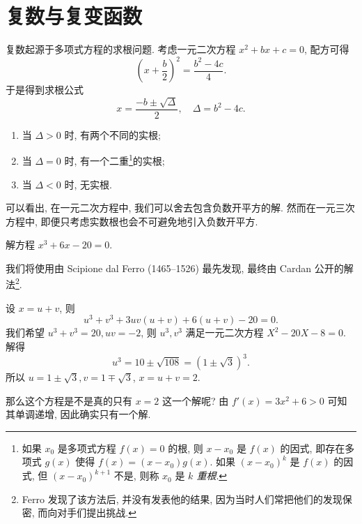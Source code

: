 
\chapter{复数与复变函数}

复数起源于多项式方程的求根问题. 
考虑一元二次方程 $x^2+bx+c=0$, 配方可得
  \[\left(x+\frac b2\right)^2=\frac{b^2-4c}4.\]
于是得到求根公式
  \[x=\frac{-b\pm\sqrt\Delta}2,\quad \Delta=b^2-4c.\]
\begin{enumerate}
  \item 当 $\Delta>0$ 时, 有两个不同的实根;
  \item 当 $\Delta=0$ 时, 有一个二重\footnote{如果 $x_0$ 是多项式方程 $f(x)=0$ 的根, 则 $x-x_0$ 是 $f(x)$ 的因式, 即存在多项式 $g(x)$ 使得 $f(x)=(x-x_0)g(x)$.
  如果 $(x-x_0)^k$ 是 $f(x)$ 的因式, 但 $(x-x_0)^{k+1}$ 不是, 则称 $x_0$ 是 \emph{$k$ 重根}.}的实根;
  \item 当 $\Delta<0$ 时, 无实根.
\end{enumerate}

可以看出, 在一元二次方程中, 我们可以舍去包含\alert{负数开平方}的解. 然而在一元三次方程中, 即便只考虑实数根也会不可避免地引入负数开平方.

\begin{example}
  解方程 $x^3+6x-20=0$.
\end{example}
我们将使用由 Scipione dal Ferro (1465--1526) 最先发现, 最终由 Cardan 公开的解法\footnote{Ferro 发现了该方法后, 并没有发表他的结果, 因为当时人们常把他们的发现保密, 而向对手们提出挑战.}.
\begin{solution}
  设 $x=u+v$, 则
    \[u^3+v^3+3uv(u+v)+6(u+v)-20=0.\]
  我们希望 $u^3+v^3=20, uv=-2$, 则 $u^3,v^3$ 满足一元二次方程 $X^2-20X-8=0$.
  解得
    \[u^3=10\pm\sqrt{108}{=(1\pm\sqrt3)^3.}\]
  所以 $u=1\pm\sqrt3, v=1\mp\sqrt 3$, $x=u+v=2$.
\end{solution}

那么这个方程是不是真的只有 $x=2$ 这一个解呢?
由 $f'(x)=3x^2+6>0$ 可知其单调递增, 因此确实只有一个解.

